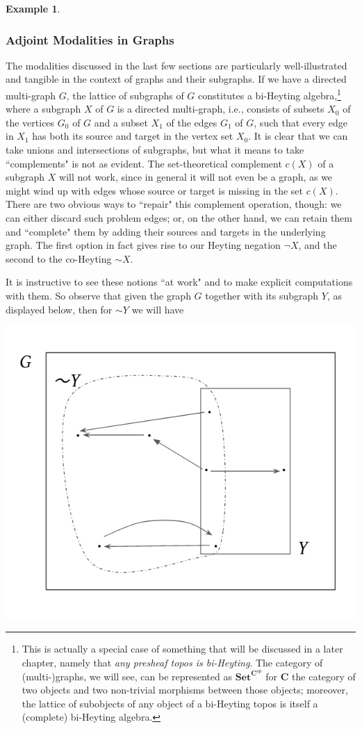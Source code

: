 \documentclass[11pt]{book}
\theoremstyle{definition}
\newtheorem{example}{Example}[section]
\theoremstyle{definition}
\theoremstyle{definition}
\theoremstyle{theorem}
\theoremstyle{definition}
\begin{document}
\begin{example}
\subsubsection{Adjoint Modalities in Graphs}
	The modalities discussed in the last few sections are particularly well-illustrated and tangible in the context of graphs and their subgraphs. If we have a directed multi-graph $G$, the lattice of subgraphs of $G$ constitutes a bi-Heyting algebra,\footnote{This is actually a special case of something that will be discussed in a later chapter, namely that \textit{any presheaf topos is bi-Heyting}. The category of (multi-)graphs, we will see, can be represented as $\textbf{Set}^{\textbf{C}^{op}}$ for $\textbf{C}$ the category of two objects and two non-trivial morphisms between those objects; moreover, the lattice of subobjects of any object of a bi-Heyting topos is itself a (complete) bi-Heyting algebra.} where a subgraph $X$ of $G$ is a directed multi-graph, i.e., consists of subsets $X_0$ of the vertices $G_0$ of $G$ and a subset $X_1$ of the edges $G_1$ of $G$, such that every edge in $X_1$ has both its source and target in the vertex set $X_0$. It is clear that we can take unions and intersections of subgraphs, but what it means to take ``complements" is not as evident. The set-theoretical complement $c(X)$ of a subgraph $X$ will not work, since in general it will not even be a graph, as we might wind up with edges whose source or target is missing in the set $c(X)$. There are two obvious ways to ``repair" this complement operation, though: we can either discard such problem edges; or, on the other hand, we can retain them and ``complete" them by adding their sources and targets in the underlying graph. The first option in fact gives rise to our Heyting negation $\neg X$, and the second to the co-Heyting $\sim X$. \par 
	It is instructive to see these notions ``at work" and to make explicit computations with them. So observe that given the graph $G$ together with its subgraph $Y$, as displayed below, then for $\sim Y$ we will have 
	\begin{center}
		\includegraphics*[scale=0.3]{GraphNegationAlone2.png}

\end{center}
\end{example}
\end{document}
